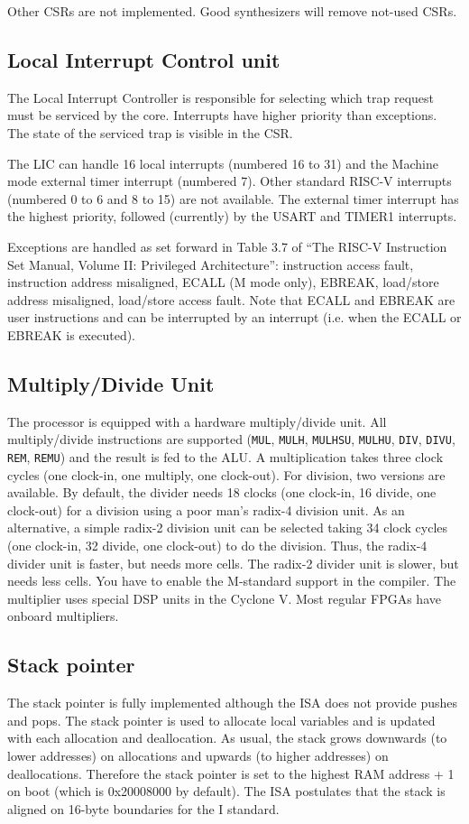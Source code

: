 \documentclass[12pt]{article}
\begin{document}
Other CSRs are not implemented. Good synthesizers will remove not-used CSRs.

\subsection{Local Interrupt Control unit}
The Local Interrupt Controller is responsible for selecting which trap request must be serviced by the core. Interrupts have higher priority than exceptions. The state of the serviced trap is visible in the CSR.

The LIC can handle 16 local interrupts (numbered 16 to 31) and the Machine mode external timer interrupt (numbered 7). Other standard RISC-V interrupts (numbered 0 to 6 and 8 to 15) are not available. The external timer interrupt has the highest priority, followed (currently) by the USART and TIMER1 interrupts.

Exceptions are handled as set forward in Table 3.7 of ``The RISC-V Instruction Set Manual, Volume II: Privileged Architecture'': instruction access fault, instruction address misaligned, ECALL (M mode only), EBREAK, load/store address misaligned, load/store access fault. Note that ECALL and EBREAK are user instructions and can be interrupted by an interrupt (i.e. when the ECALL or EBREAK is executed).

\subsection{Multiply/Divide Unit}
The processor is equipped with a hardware multiply/divide unit. All multiply/divide instructions are supported (\texttt{MUL}, \texttt{MULH}, \texttt{MULHSU}, \texttt{MULHU}, \texttt{DIV}, \texttt{DIVU}, \texttt{REM}, \texttt{REMU}) and the result is fed to the ALU. A multiplication takes three clock cycles (one clock-in, one multiply, one clock-out). For division, two versions are available. By default, the divider needs 18 clocks (one clock-in, 16 divide, one clock-out) for a division using a poor man's radix-4 division unit. As an alternative, a simple radix-2 division unit can be selected taking 34 clock cycles (one clock-in, 32 divide, one clock-out) to do the division.  Thus, the radix-4 divider unit is faster, but needs more cells. The radix-2 divider unit is slower, but needs less cells. You have to enable the M-standard support in the compiler. The multiplier uses special DSP units in the Cyclone V. Most regular FPGAs have onboard multipliers.


\subsection{Stack pointer}
The stack pointer is fully implemented although the ISA does not provide pushes and pops. The stack pointer is used to allocate local variables and is updated with each allocation and deallocation. As usual, the stack grows downwards (to lower addresses) on allocations and upwards (to higher addresses) on deallocations. Therefore the stack pointer is set to the highest RAM address + 1 on boot (which is 0x20008000 by default). The ISA postulates that the stack is aligned on 16-byte boundaries for the I standard.
\end{document}
